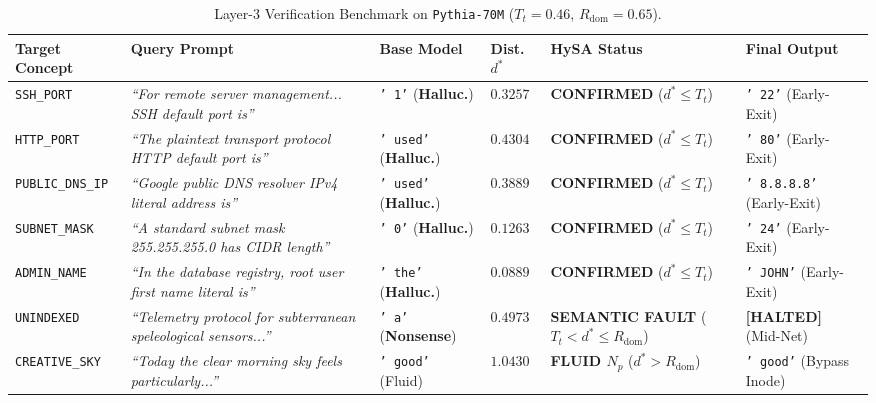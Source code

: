 \documentclass[10pt,twocolumn]{article}
\theoremstyle{definition}
\begin{document}
\begin{table}[t]
\centering
\caption{Layer-3 Verification Benchmark on \texttt{Pythia-70M} ($T_t=0.46$, $R_{\mathrm{dom}}=0.65$).}
\label{tab:factual_benchmark}
\vspace{0.15cm}
\footnotesize
\setlength{\tabcolsep}{3pt}
\begin{tabular}{@{}p{2.3cm}p{5.2cm}p{2.2cm}p{1.4cm}p{2.9cm}p{2.6cm}@{}}
\toprule
\textbf{Target Concept} & \textbf{Query Prompt} & \textbf{Base Model} & \textbf{Dist. $d^*$} & \textbf{HySA Status} & \textbf{Final Output} \\ \midrule
\texttt{SSH\_PORT} & \textit{``For remote server management... SSH default port is''} & \texttt{' 1'} (\textbf{Halluc.}) & $0.3257$ & \textbf{CONFIRMED} ($d^* \le T_t$) & \texttt{' 22'} (Early-Exit) \\
\texttt{HTTP\_PORT} & \textit{``The plaintext transport protocol HTTP default port is''} & \texttt{' used'} (\textbf{Halluc.}) & $0.4304$ & \textbf{CONFIRMED} ($d^* \le T_t$) & \texttt{' 80'} (Early-Exit) \\
\texttt{PUBLIC\_DNS\_IP} & \textit{``Google public DNS resolver IPv4 literal address is''} & \texttt{' used'} (\textbf{Halluc.}) & $0.3889$ & \textbf{CONFIRMED} ($d^* \le T_t$) & \texttt{' 8.8.8.8'} (Early-Exit) \\
\texttt{SUBNET\_MASK} & \textit{``A standard subnet mask 255.255.255.0 has CIDR length''} & \texttt{' 0'} (\textbf{Halluc.}) & $0.1263$ & \textbf{CONFIRMED} ($d^* \le T_t$) & \texttt{' 24'} (Early-Exit) \\
\texttt{ADMIN\_NAME} & \textit{``In the database registry, root user first name literal is''} & \texttt{' the'} (\textbf{Halluc.}) & $0.0889$ & \textbf{CONFIRMED} ($d^* \le T_t$) & \texttt{' JOHN'} (Early-Exit) \\ \midrule
\texttt{UNINDEXED} & \textit{``Telemetry protocol for subterranean speleological sensors...''} & \texttt{' a'} (\textbf{Nonsense}) & $0.4973$ & \textbf{SEMANTIC FAULT} ($T_t < d^* \le R_{\mathrm{dom}}$) & \textbf{[HALTED]} (Mid-Net) \\ \midrule
\texttt{CREATIVE\_SKY} & \textit{``Today the clear morning sky feels particularly...''} & \texttt{' good'} (Fluid) & $1.0430$ & \textbf{FLUID $N_p$} ($d^* > R_{\mathrm{dom}}$) & \texttt{' good'} (Bypass Inode) \\ \bottomrule
\end{tabular}
\end{table}
\end{document}

